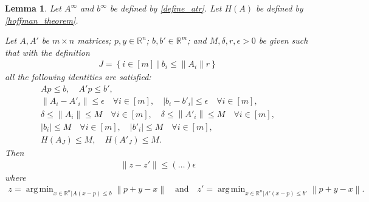 \documentclass{article}
\newtheorem{lemma}[theorem]{Lemma}
\theoremstyle{case}
\numberwithin{theorem}{subsection}
\DeclareMathOperator*{\argmin}{arg\,min}
\newcommand{\atr}{A^{\infty}}
\newcommand{\btr}{b^{\infty}}
\newcommand{\Rm}{\mathbb R^m}
\newcommand{\Rn}{\mathbb R^n}
\begin{document}
\begin{lemma}
\label{master_projection_lemma}
Let $\atr$ and $\btr$ be defined by \cref{define_atr}.
Let $H(A)$ be defined by \cref{hoffman_theorem}.

Let $A, A'$ be $m \times n$ matrices;
$p, y \in \Rn$; $b, b' \in \Rm$;
and $M,\delta, r, \epsilon > 0$ be given 
such that 
with the definition
\begin{align*}
J = \left\{i \in [m] \; \bigg | \; b_i \le \|A_i\|r  \right\}
\end{align*}
all the following identities are satisfied:
\begin{align*}
Ap \le b,
\quad 
A'p \le b', \\
\left\|A_i - A'_i \right\| \le \epsilon\quad \forall i \in [m],
\quad 
\left|b_i - b'_i \right| \le \epsilon \quad \forall i \in [m], \\
\delta \le \left\|A_i\right\| \le M \quad \forall i \in [m],
\quad 
\delta \le \left\|A'_i\right\| \le M \quad \forall i \in [m], \\
\left|b_i\right| \le M \quad \forall i \in [m],
\quad 
\left|b'_i\right| \le M \quad \forall i \in [m], \\
H\left(A_J\right) \le M, \quad H\left(A'_J\right) \le M.
\end{align*}
Then
\begin{align*}
\|z - z'\| \le \left(\ldots\right) \epsilon
\end{align*}
where
\begin{align*}
z  = \argmin_{x \in \Rn | A (x - p) \le b }\left\|p + y - x\right\|
\quad \textrm{and} \quad
z' = \argmin_{x \in \Rn | A'(x - p) \le b'}\left\|p + y - x\right\|.
\end{align*}
\end{lemma}
\end{document}
